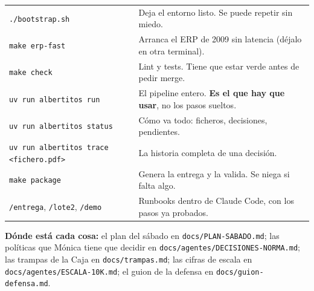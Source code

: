 \documentclass[11pt,a4paper]{article}
\newcommand{\cmd}[1]{\texttt{\small #1}}
\begin{document}
\begin{center}
\begin{tabularx}{\linewidth}{lX}
\toprule
\cmd{./bootstrap.sh} & Deja el entorno listo. Se puede repetir sin miedo. \\
\cmd{make erp-fast} & Arranca el ERP de 2009 sin latencia (déjalo en otra terminal). \\
\cmd{make check} & Lint y tests. Tiene que estar verde antes de pedir merge. \\
\cmd{uv run albertitos run} & El pipeline entero. \textbf{Es el que hay que usar}, no los pasos sueltos. \\
\cmd{uv run albertitos status} & Cómo va todo: ficheros, decisiones, pendientes. \\
\cmd{uv run albertitos trace <fichero.pdf>} & La historia completa de una decisión. \\
\cmd{make package} & Genera la entrega y la valida. Se niega si falta algo. \\
\cmd{/entrega}, \cmd{/lote2}, \cmd{/demo} & Runbooks dentro de Claude Code, con los pasos ya probados. \\
\bottomrule
\end{tabularx}
\end{center}

\vspace{1em}
\noindent\textbf{Dónde está cada cosa:} el plan del sábado en \cmd{docs/PLAN-SABADO.md}; las políticas que
Mónica tiene que decidir en \cmd{docs/agentes/DECISIONES-NORMA.md}; las trampas de la Caja en
\cmd{docs/trampas.md}; las cifras de escala en \cmd{docs/agentes/ESCALA-10K.md}; el guion de la defensa en
\cmd{docs/guion-defensa.md}.
\end{document}

